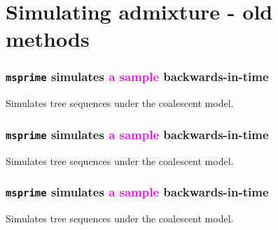 \documentclass[11pt, mathserif, aspectratio=169]{beamer}
\newcommand{\magenta}[1]{\textcolor{magenta}{#1}}
\newcommand{\gray}[1]{\textcolor{gray}{#1}}
\newenvironment{wideitemize}{\itemize\addtolength{\itemsep}{10pt}}{\enditemize}
\begin{document}
\section{Simulating admixture - old methods}

\begin{frame}
\frametitle{\texttt{msprime} simulates \magenta{a sample} backwards-in-time}
\begin{minipage}{.48\textwidth}

\end{minipage}\hfill
\begin{minipage}{.48\textwidth}
Simulates tree sequences under the coalescent model.\\[5mm]
\end{minipage}
\end{frame}

\begin{frame}
\frametitle{\texttt{msprime} simulates \magenta{a sample} backwards-in-time}
\begin{minipage}{.48\textwidth}

\end{minipage}\hfill
\begin{minipage}{.48\textwidth}
Simulates tree sequences under the coalescent model.\\[5mm]
\end{minipage}
\end{frame}

\begin{frame}
\frametitle{\texttt{msprime} simulates \magenta{a sample} backwards-in-time}
\begin{minipage}{.48\textwidth}

\end{minipage}\hfill
\begin{minipage}{.48\textwidth}
Simulates tree sequences under the coalescent model.\\[5mm]
\end{minipage}
\end{frame}
\end{document}
